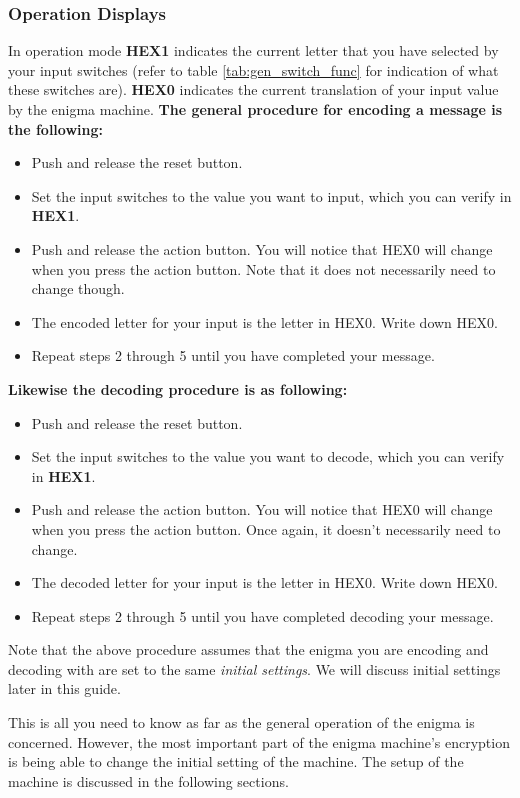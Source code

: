 \documentclass{article}
\begin{document}
\subsubsection{Operation Displays}
In operation mode \textbf{HEX1} indicates the current letter that you have selected by your input switches (refer to table \ref{tab:gen_switch_func} for indication of what these switches are). \textbf{HEX0} indicates the current translation of your input value by the enigma machine. \textbf{The general procedure for encoding a message is the following: }
\begin{itemize}
    \item Push and release the reset button.
    \item Set the input switches to the value you want to input, which you can verify in \textbf{HEX1}.
    \item Push and release the action button. You will notice that HEX0 will change when you press the action button. Note that it does not necessarily need to change though. 
    \item The encoded letter for your input is the letter in HEX0. Write down HEX0. 
    \item Repeat steps 2 through 5 until you have completed your message. 
\end{itemize}


\textbf{Likewise the decoding procedure is as following: }

\begin{itemize}
    \item Push and release the reset button.
    \item Set the input switches to the value you want to decode, which you can verify in \textbf{HEX1}.
    \item Push and release the action button. You will notice that HEX0 will change when you press the action button. Once again, it doesn't necessarily need to change. 
    \item The decoded letter for your input is the letter in HEX0. Write down HEX0. 
    \item Repeat steps 2 through 5 until you have completed decoding your message. 
\end{itemize}

Note that the above procedure assumes that the enigma you are encoding and decoding with are set to the same \textit{initial settings}. We will discuss initial settings later in this guide. 

This is all you need to know as far as the general operation of the enigma is concerned. However, the most important part of the enigma machine's encryption is being able to change the initial setting of the machine. The setup of the machine is discussed in the following sections. 
\end{document}
